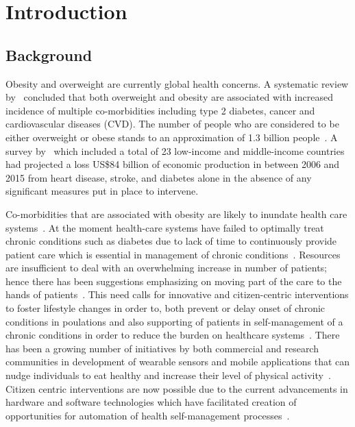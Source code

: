 
\chapter{Introduction} %

\label{introductionchapter} %


\section{Background}
Obesity and overweight are currently global health concerns. A systematic review by~\cite{guh2009incidence} concluded that both overweight and obesity are associated with increased incidence of multiple co-morbidities including type 2 diabetes, cancer and cardiovascular diseases (CVD). The number of people who are considered to be either overweight or obese stands to an approximation of  1.3 billion people~\citep{steyn2006chronic}. A survey by~\cite{abegunde:theburden} which included a total of 23 low-income and middle-income countries had projected a loss US\$84 billion of economic production in between 2006 and 2015 from heart disease, stroke, and diabetes alone in the absence of any significant measures put in place to intervene.

Co-morbidities that are associated with obesity are likely to inundate health care systems~\citep{pollak2010s}. At the moment health-care systems have failed to optimally treat chronic conditions such as diabetes due to lack of time to continuously provide  patient  care which is essential in management of chronic conditions~\citep{quinn2008welldoc}. Resources are insufficient to deal with an overwhelming increase in number of patients; hence there has been suggestions emphasizing on moving part of the care to the hands of patients~\citep{aarsand2012mobile}. This need calls for innovative and citizen-centric  interventions to foster lifestyle changes in order to, both prevent or delay onset of chronic conditions in poulations and also supporting of patients in self-management of a chronic conditions in order to reduce the burden on healthcare systems~\citep{korhonen2010personal,aarsand2012mobile,higgins2016smartphone}. There has been a growing number of initiatives by both commercial and research communities in development of wearable sensors and mobile applications that can nudge individuals to eat healthy and increase their level of physical activity~\citep{chen2014healthytogether}. Citizen centric interventions are now possible due to the current advancements in hardware and software technologies which have facilitated creation of opportunities for automation of health self-management processes~\citep{arsand:mobile}. 

